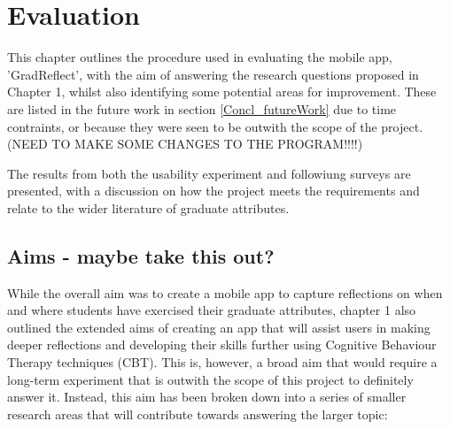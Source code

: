 \documentclass{l4proj}
\begin{document}


\chapter{Evaluation} \label{evaluation}

This chapter outlines the procedure used in evaluating the mobile app, 'GradReflect', with the aim of answering the research questions proposed in Chapter 1, whilst also identifying some potential areas for improvement. These are listed in the future work in section \ref{Concl_futureWork} due to time contraints, or because they were seen to be outwith the scope of the project. (NEED TO MAKE SOME CHANGES TO THE PROGRAM!!!!)

The results from both the usability experiment and followiung surveys are presented, with a discussion on how the project meets the requirements and relate to the wider literature of graduate attributes. 

\section{Aims - maybe take this out?} \label{evalAims}

While the overall aim was to create a mobile app to capture reflections on when and where students have exercised their graduate attributes, chapter 1 also outlined the extended aims of creating an app that will assist users in making deeper reflections and developing their skills further using Cognitive Behaviour Therapy techniques (CBT). This is, however, a broad aim that would require a long-term experiment that is outwith the scope of this project to definitely answer it. Instead, this aim has been broken down into a series of smaller research areas that will contribute towards answering the larger topic:
\end{document}
